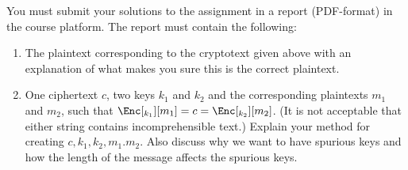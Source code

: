 \documentclass[a4paper]{article}
\begin{document}
You must submit your solutions to the assignment in a report (PDF-format) in 
the course platform.
The report must contain the following:
\begin{enumerate}
  \item The plaintext corresponding to the cryptotext given above with an 
    explanation of what makes you sure this is the correct plaintext.


  \item One ciphertext \(c\), two keys \(k_1\) and \(k_2\) and the 
    corresponding plaintexts \(m_1\) and \(m_2\), such that \(\Enc[_{k_1}][m_1] 
    = c = \Enc[_{k_2}][m_2]\).
    (It is not acceptable that either string contains incomprehensible text.)
    Explain your method for creating \(c, k_1, k_2, m_1. m_2\).
    Also discuss why we want to have spurious keys and how the length of the 
    message affects the spurious keys.

\end{enumerate}


\printbibliography{}
\end{document}
